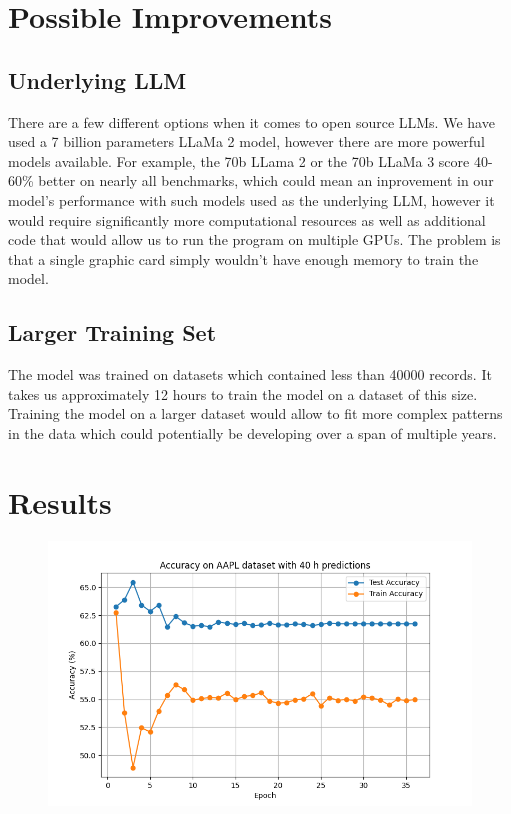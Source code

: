 \section{Possible Improvements}

\subsection{Underlying LLM}
There are a few different options when it comes to open source LLMs. We have used a 7 billion parameters LLaMa 2 model, however there are more powerful models available. For example, the 70b LLama 2 or the 70b LLaMa 3 score 40-60\% better on nearly all benchmarks, which could mean an inprovement in our model's performance with such models used as the underlying LLM, however it would require significantly more computational resources as well as additional code that would allow us to run the program on multiple GPUs. The problem is that a single graphic card simply wouldn't have enough memory to train the model.

\subsection{Larger Training Set}
The model was trained on datasets which contained less than 40000 records. It takes us approximately 12 hours to train the model on a dataset of this size. Training the model on a larger dataset would allow to fit more complex patterns in the data which could potentially be developing over a span of multiple years.

\section{Results}

\begin{figure}[h!]
	\centering
	\includegraphics[width=\linewidth]{"pictures/aapl_40h_results.png"}
	\caption{}
	\label{fig:aapl_fig}
\end{figure}

